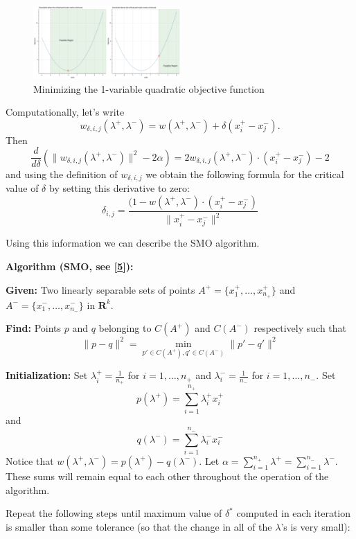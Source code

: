 \documentclass[
]{article}
\begin{document}
\begin{figure}
\hypertarget{fig:quadratics}{%
\centering
\includegraphics[width=0.5\textwidth,height=\textheight]{../img/quadratic.png}
\caption{Minimizing the 1-variable quadratic objective
function}\label{fig:quadratics}
}
\end{figure}

Computationally, let's write \[
w_{\delta,i,j}(\lambda^{+},\lambda^{-}) = w(\lambda^{+},\lambda^{-})+\delta(x^{+}_{i}-x^{-}_{j}).
\] Then \[
\frac{d}{d\delta}(\|w_{\delta,i,j}(\lambda^{+},\lambda^{-})\|^2-2\alpha)  = 2w_{\delta,i,j}(\lambda^{+},\lambda^{-})\cdot(x^{+}_{i}-x^{-}_{j})-2
\] and using the definition of \(w_{\delta,i,j}\) we obtain the
following formula for the critical value of \(\delta\) by setting this
derivative to zero: \[
\delta_{i,j} = \frac{(1-w(\lambda^{+},\lambda^{-})\cdot(x_{i}^{+}-x_{j}^{-})}{\|x^+_{i}-x^{-}_{j}\|^2}
\]

Using this information we can describe the SMO algorithm.

\textbf{Algorithm (SMO, see {[}\protect\hyperlink{ref-plattSMO}{5}{]}):}

\textbf{Given:} Two linearly separable sets of points
\(A^{+}=\{x_{1}^{+},\ldots,x_{n_{+}}^{+}\}\) and
\(A^{-}=\{x_{1}^{-},\ldots, x_{n_{-}}^{-}\}\) in \(\mathbf{R}^{k}\).

\textbf{Find:} Points \(p\) and \(q\) belonging to \(C(A^{+})\) and
\(C(A^{-})\) respectively such that \[
\|p-q\|^2=\min_{p'\in C(A^{+}),q'\in C(A^{-})} \|p'-q'\|^2
\]

\textbf{Initialization:} Set \(\lambda_{i}^{+}=\frac{1}{n_{+}}\) for
\(i=1,\ldots, n_{+}\) and \(\lambda_{i}^{-}=\frac{1}{n_{-}}\) for
\(i=1,\ldots, n_{-}\). Set \[
p(\lambda^{+})=\sum_{i=1}^{n_{+}}\lambda^{+}_{i}x^{+}_{i}
\] and \[
q(\lambda^{-})=\sum_{i=1}^{n_{-}}\lambda^{-}_{i}x^{-}_{i}
\] Notice that
\(w(\lambda^{+},\lambda^{-})=p(\lambda^{+})-q(\lambda^{-})\). Let
\(\alpha=\sum_{i=1}^{n_{+}}\lambda^{+}=\sum_{i=1}^{n_{-}}\lambda^{-}\).
These sums will remain equal to each other throughout the operation of
the algorithm.

Repeat the following steps until maximum value of \(\delta^{*}\)
computed in each iteration is smaller than some tolerance (so that the
change in all of the \(\lambda\)'s is very small):
\end{document}
